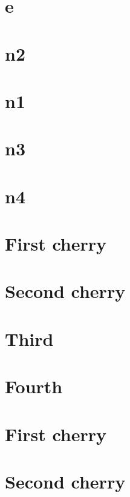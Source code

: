 \documentclass[]{book}
\theoremstyle{definition}
\theoremstyle{definition}
\theoremstyle{definition}
\theoremstyle{remark}
\begin{document}
\hypertarget{e}{%
\section{e}\label{e}}

\hypertarget{n2}{%
\section{n2}\label{n2}}

\hypertarget{n1}{%
\section{n1}\label{n1}}

\hypertarget{n3}{%
\section{n3}\label{n3}}

\hypertarget{n4}{%
\section{n4}\label{n4}}

\hypertarget{first-cherry}{%
\section{First cherry}\label{first-cherry}}

\hypertarget{second-cherry}{%
\section{Second cherry}\label{second-cherry}}

\hypertarget{third}{%
\section{Third}\label{third}}

\hypertarget{fourth}{%
\section{Fourth}\label{fourth}}

\hypertarget{first-cherry-1}{%
\section{First cherry}\label{first-cherry-1}}

\hypertarget{second-cherry-1}{%
\section{Second cherry}\label{second-cherry-1}}
\end{document}

